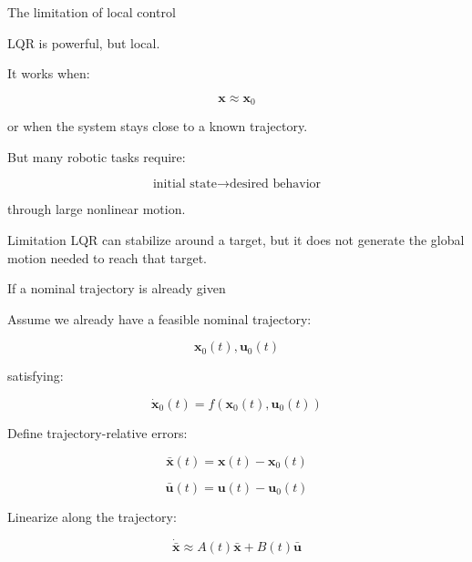 \documentclass[aspectratio=169]{beamer}
\begin{document}
\begin{frame}{The limitation of local control}
\large

LQR is powerful, but local.

\vspace{0.3cm}

It works when:

\[
\bm{x} \approx \bm{x}_0
\]

or when the system stays close to a known trajectory.

\vspace{0.4cm}

But many robotic tasks require:

\[
\text{initial state}
\longrightarrow
\text{desired behavior}
\]

through large nonlinear motion.

\vspace{0.4cm}

\begin{block}{Limitation}
LQR can stabilize around a target, but it does not generate the global motion needed to reach that target.
\end{block}

\end{frame}

\begin{frame}{If a nominal trajectory is already given}
\large

Assume we already have a feasible nominal trajectory:

\[
\bm{x}_0(t), \bm{u}_0(t)
\]

satisfying:

\[
\dot{\bm{x}}_0(t)
=
f(\bm{x}_0(t),\bm{u}_0(t))
\]

Define trajectory-relative errors:

\[
\bar{\bm{x}}(t)
=
\bm{x}(t)-\bm{x}_0(t)
\]

\[
\bar{\bm{u}}(t)
=
\bm{u}(t)-\bm{u}_0(t)
\]

Linearize along the trajectory:

\[
\dot{\bar{\bm{x}}}
\approx
A(t)\bar{\bm{x}}
+
B(t)\bar{\bm{u}}
\]

\end{frame}
\end{document}
